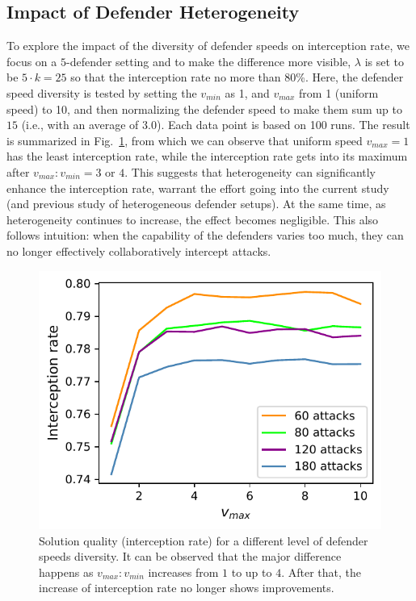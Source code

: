 \subsection{Impact of Defender Heterogeneity}
To explore the impact of the diversity of defender speeds on interception rate, we focus on a $5$-defender setting and to make the difference more visible, $\lambda$ is set to be $5\cdot k = 25$ so that the interception rate no more than 80\%. 
Here, the defender speed diversity is tested by setting the $v_{min}$ as 1, and $v_{max}$ from 1 (uniform speed) to 10, and then normalizing the defender speed to make them sum up to $15$ (i.e., with an average of $3.0$). 
Each data point is based on 100 runs. The result is summarized in Fig.~\ref{fig:heterogeneity}, from which we can observe that uniform speed $v_{max} = 1$ has the least interception rate, while the interception rate gets into its maximum after $v_{max}:v_{min} = 3$ or $4$. This suggests that heterogeneity can significantly enhance the interception rate, warrant the effort going into the current study (and previous study of heterogeneous defender setups). At the same time, as heterogeneity continues to increase, the effect becomes negligible. This also follows intuition: when the capability of the defenders varies too much, they can no longer effectively collaboratively intercept attacks. 

\begin{figure}[h!]
    \centering
    \includegraphics[width=0.9\linewidth]{chapters/pd/fig/heterogeneity.pdf}
    \caption{Solution quality (interception rate) for a different level of defender speeds diversity. It can be observed that the major difference happens as $v_{max}:v_{min}$ increases from $1$ to up to $4$. After that, the increase of interception rate no longer shows improvements.}
    \label{fig:heterogeneity}
    \vspace{-2mm}
\end{figure}

